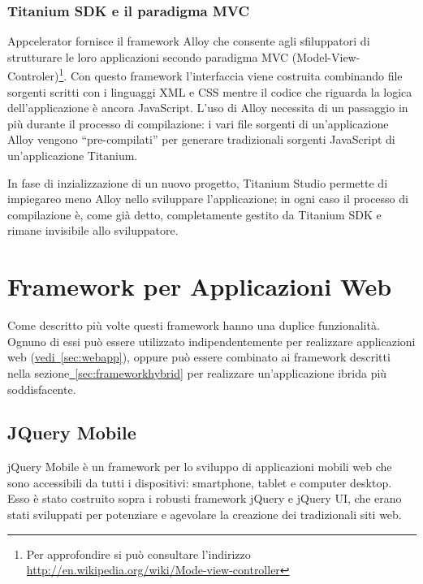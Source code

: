 			\subsubsection{Titanium SDK e il paradigma MVC}
				Appcelerator fornisce il framework Alloy che consente agli 
				sfiluppatori di strutturare le loro applicazioni secondo 
				paradigma MVC (Model-View-Controler)\footnote{Per approfondire 
				si può consultare l'indirizzo 
				\url{http://en.wikipedia.org/wiki/Mode-view-controller}}. Con 
				questo framework l'interfaccia viene costruita combinando file 
				sorgenti scritti con i linguaggi XML e CSS mentre il codice che 
				riguarda la logica dell'applicazione è ancora JavaScript. 
				L'uso di Alloy necessita di un passaggio in più durante il 
				processo di compilazione: i vari file sorgenti di 
				un'applicazione Alloy vengono ``pre-compilati'' per generare 
				tradizionali sorgenti JavaScript di un'applicazione Titanium.
				
				In fase di inzializzazione di un nuovo progetto, Titanium Studio 
				permette di impiegareo meno Alloy nello sviluppare 
				l'applicazione; in ogni caso il processo di compilazione è, come 
				già detto, completamente gestito da Titanium SDK e rimane 
				invisibile allo	sviluppatore.
			
	\section{Framework per Applicazioni Web}	
	\label{sec:frameworkwebapp}
	
		Come descritto più volte questi framework hanno una duplice funzionalità.
		Ognuno di essi può essere utilizzato indipendentemente per realizzare
		applicazioni web (\hyperref[sec:webapp]{vedi~\ref{sec:webapp}}), oppure 
		può essere combinato ai framework descritti nella 
		sezione\hyperref[sec:frameworkhybrid]{~\ref{sec:frameworkhybrid}} per
		realizzare un'applicazione ibrida più soddisfacente. 
		\subsection{JQuery Mobile}
			jQuery Mobile è un framework per lo sviluppo di applicazioni mobili web
			che sono accessibili da tutti i dispositivi: smartphone, tablet e 
			computer desktop. Esso è stato costruito sopra i robusti framework
			jQuery e jQuery UI, che erano stati sviluppati per potenziare e agevolare
			la creazione dei tradizionali siti web. 
			
